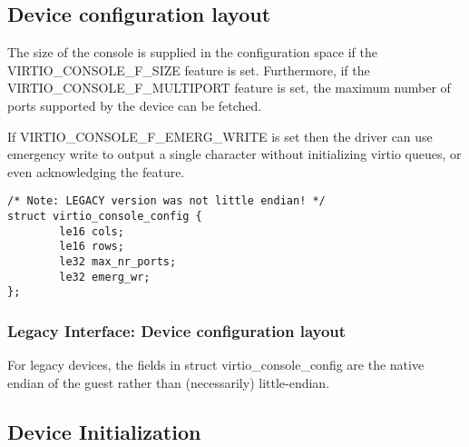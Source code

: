 \subsection{Device configuration layout}\label{sec:Device Types / Console Device / Device configuration layout}

  The size of the console is supplied
  in the configuration space if the VIRTIO_CONSOLE_F_SIZE feature
  is set. Furthermore, if the VIRTIO_CONSOLE_F_MULTIPORT feature
  is set, the maximum number of ports supported by the device can
  be fetched.

  If VIRTIO_CONSOLE_F_EMERG_WRITE is set then the driver can use emergency write
  to output a single character without initializing virtio queues, or even
  acknowledging the feature.

\begin{lstlisting}
/* Note: LEGACY version was not little endian! */
struct virtio_console_config {
        le16 cols;
        le16 rows;
        le32 max_nr_ports;
        le32 emerg_wr;
};
\end{lstlisting}

\subsubsection{Legacy Interface: Device configuration layout}\label{sec:Device Types / Console Device / Device configuration layout / Legacy Interface: Device configuration layout}
For legacy devices, the fields in struct virtio_console_config are the
native endian of the guest rather than (necessarily) little-endian.

\subsection{Device Initialization}\label{sec:Device Types / Console Device / Device Initialization}

